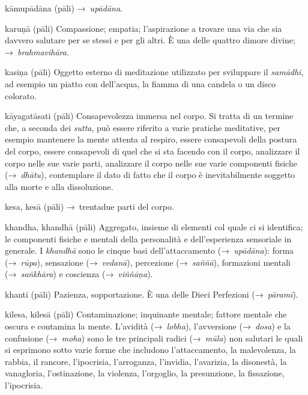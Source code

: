 \begin{glossarydescription}
\item[kāmupādāna] (pāli) →~\emph{upādāna}.

\item[karuṇā] (pāli) Compassione; empatia; l'aspirazione a trovare una via che
  sia davvero salutare per se stessi e per gli altri. È una delle quattro dimore
  divine; →~\emph{brahmavihāra}.

\item[kasiṇa] (pāli) Oggetto esterno di meditazione utilizzato per sviluppare il
  \emph{samādhi}, ad esempio un piatto con dell'acqua, la fiamma di una candela
  o un disco colorato.

\item[kāyagatāsati] (pāli) Consapevolezza immersa nel corpo. Si tratta di un
  termine che, a seconda dei \emph{sutta}, può essere riferito a varie pratiche
  meditative, per esempio mantenere la mente attenta al respiro, essere
  consapevoli della postura del corpo, essere consapevoli di quel che si sta
  facendo con il corpo, analizzare il corpo nelle sue varie parti, analizzare il
  corpo nelle sue varie componenti fisiche (→~\emph{dhātu}), contemplare il dato
  di fatto che il corpo è inevitabilmente soggetto alla morte e alla
  dissoluzione.

\item[kesa, kesā] (pāli) →~trentadue parti del corpo.

\item[khandha, khandhā] (pāli) Aggregato, insieme di elementi col quale ci si
  identifica; le componenti fisiche e mentali della personalità e
  dell'esperienza sensoriale in generale. I \emph{khandhā} sono le cinque basi
  dell'attaccamento (→~\emph{upādāna}): forma (→~\emph{rūpa}), sensazione
  (→~\emph{vedanā}), percezione (→~\emph{saññā}), formazioni mentali
  (→~\emph{saṅkhāra}) e coscienza (→~\emph{viññāṇa}).

\item[khanti] (pāli) Pazienza, sopportazione. È una delle Dieci Perfezioni
  (→~\emph{pāramī}).

\item[kilesa, kilesā] (pāli) Contaminazione; inquinante mentale; fattore mentale
  che oscura e contamina la mente. L'avidità (→~\emph{lobha}), l'avversione
  (→~\emph{dosa}) e la confusione (→~\emph{moha}) sono le tre principali radici
  (→~\emph{mūla}) non salutari le quali si esprimono sotto varie forme che
  includono l'attaccamento, la malevolenza, la rabbia, il rancore, l'ipocrisia,
  l'arroganza, l'invidia, l'avarizia, la disonestà, la vanagloria,
  l'ostinazione, la violenza, l'orgoglio, la presunzione, la fissazione,
  l'ipocrisia.


\end{glossarydescription}

